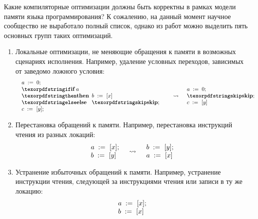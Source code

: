 Какие компиляторные оптимизации должны быть корректны в рамках модели памяти языка программирования?
К сожалению, на данный момент научное сообщество не выработало полный список, однако из работ
\cite{Vafeiadis-al:POPL15,Morisset-al:PLDI13,Sevcik-Aspinall:ECOOP08} можно выделить пять основных групп таких оптимизаций.
\begin{enumerate}
  \item Локальные оптимизации, не меняющие обращения к памяти в возможных сценариях исполнения.
    Например, удаление условных переходов, зависимых от заведомо ложного условия:
    \[
      \begin{array}{l c l}
        \begin{array}{l}
        \assignInst{a}{0}; \\
        \iteml{a}{\readInst{b}{x}}{\skipc;} \\
        \readInst{c}{y}; \\
        \end{array}
        & \optarrow &
        \begin{array}{l}
          \assignInst{a}{0}; \\
          \skipc; \\
          \readInst{c}{y}
        \end{array}
      \end{array}
    \]
  \item Перестановка обращений к памяти.
    Например, перестановка инструкций чтения из разных локаций:
    \[
      \begin{array}{l c l}
        \begin{array}{l}
        a \;:=_{}\;[x]; \\
        b \;:=_{}\;[y]
        \end{array}
        & \rightsquigarrow &
        \begin{array}{l}
        b \;:=_{}\;[y]; \\
        a \;:=_{}\;[x]
        \end{array}
      \end{array}
    \]
  \item Устранение избыточных обращений к памяти.
    Например, устранение инструкции чтения, следующей за инструкциями чтения или записи в ту же локацию:
    \[
    \begin{array}{c c c}
      \begin{array}{l c l}
        \begin{array}{l}
        a \;:=_{}\;[x]; \\
        b \;:=_{}\;[x]

\end{array}
\end{array}
\end{array}\]
\end{enumerate}
